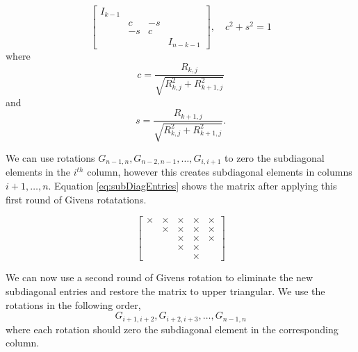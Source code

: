 \documentclass[12pt,Bold,letterpaper]{mcgilletdclass}
\begin{document}
\begin{equation} \label{eq:givensRotation}
\begin{bmatrix}
I_{k-1} &  &  & \\ 
 & c & -s & \\ 
 & -s & c & \\ 
 &  &  & I_{n-k-1}
\end{bmatrix} ,\quad c^2+s^2=1
\end{equation}
where $$c=\frac{R_{k,j}}{\sqrt{R_{k,j}^2+R_{k+1,j}^2}}$$ and $$s=\frac{R_{k+1,j}}{\sqrt{R_{k,j}^2+R_{k+1,j}^2}}.$$

We can use rotations $G_{n-1,n}, G_{n-2,n-1}, \dots, G_{i,i+1}$ to zero the subdiagonal elements in the $i^{th}$ column, however this creates subdiagonal elements in columns $i+1, \dots, n$. Equation \eqref{eq:subDiagEntries} shows the matrix after applying this first round of Givens rotatations.

\begin{equation} \label{eq:subDiagEntries}
\begin{bmatrix}
\times & \times & \times & \times & \times \\ 
  & \times & \times & \times & \times \\ 
  &   & \times & \times & \times \\ 
  &   & \times & \times &   \\ 
  &   &  &  \times & 
\end{bmatrix}
\end{equation}

We can now use a second round of Givens rotation to eliminate the new subdiagonal entries and restore the matrix to upper triangular. We use the rotations in the following order, $$G_{i+1,i+2}, G_{i+2,i+3}, \dots, G_{n-1,n}$$ where each rotation should zero the subdiagonal element in the corresponding column.
\end{document}
